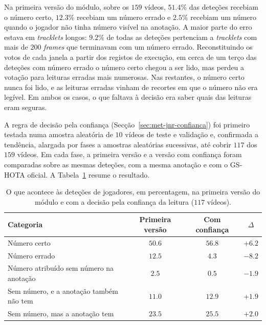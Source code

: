 Na primeira versão do módulo, sobre os $159$ vídeos, $51.4\%$ das deteções recebiam o número
certo, $12.3\%$ recebiam um número errado e $2.5\%$ recebiam um número quando o jogador não tinha
número visível na anotação. A maior parte do erro estava em \emph{tracklets} longos: $9.2\%$ de
todas as deteções pertenciam a \emph{tracklets} com mais de $200$ \emph{frames} que terminavam com
um número errado. Reconstituindo os votos de cada janela a partir dos registos de execução, em
cerca de um terço das deteções com número errado o número certo chegou a ser lido, mas perdeu a
votação para leituras erradas mais numerosas. Nas restantes, o número certo nunca foi lido, e as
leituras erradas vinham de recortes em que o número não era legível. Em ambos os casos, o que faltava à decisão era saber
quais das leituras eram seguras.

A regra de decisão pela confiança (Secção~\ref{sec:met-jnr-confianca}) foi primeiro testada numa
amostra aleatória de $10$ vídeos de teste e validação e, confirmada a tendência, alargada por fases
a amostras aleatórias sucessivas, até cobrir %
$117$ dos $159$ vídeos. %
Em cada fase, a primeira versão e a versão com confiança foram comparadas sobre as mesmas deteções,
com a mesma anotação e com o GS-HOTA oficial. A Tabela~\ref{tab:jnr-categorias} resume o resultado.

\begin{table}[htbp]
    \centering
    \caption{O que acontece às deteções de jogadores, em percentagem, na primeira versão do módulo e
    com a decisão pela confiança da leitura ($117$ vídeos). %
    }
    \label{tab:jnr-categorias}
    \begin{tabular}{|l|c|c|c|}
        \hline
        \textbf{Categoria} & \textbf{Primeira versão} & \textbf{Com confiança} & \textbf{$\Delta$} \\
        \hline
        Número certo                               & $50.6$ & $56.8$ & $+6.2$ \\ %
        \hline
        Número errado                              & $12.5$ & $4.3$  & $-8.2$ \\ %
        \hline
        Número atribuído sem número na anotação    & $2.5$  & $0.5$  & $-1.9$ \\ %
        \hline
        Sem número, e a anotação também não tem    & $11.0$ & $12.9$ & $+1.9$ \\ %
        \hline
        Sem número, mas a anotação tem             & $23.5$ & $25.5$ & $+2.0$ \\ %
        \hline
    \end{tabular}
\end{table}

